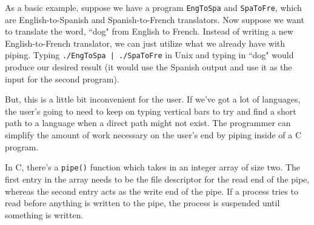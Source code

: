 As a basic example, suppose we have a program \verb!EngToSpa! and \verb!SpaToFre!, which are English-to-Spanish and Spanish-to-French translators. Now suppose we want to translate the word, ``dog" from English to French. Instead of writing a new English-to-French translator, we can just utilize what we already have with piping. Typing \verb!./EngToSpa | ./SpaToFre! in Unix and typing in ``dog" would produce our desired result (it would use the Spanish output and use it as the input for the second program).


But, this is a little bit inconvenient for the user. If we've got a lot of languages, the user's going to need to keep on typing vertical bars to try and find a short path to a language when a direct path might not exist. The programmer can simplify the amount of work necessary on the user's end by piping inside of a C program.


In C, there's a \verb!pipe()! function which takes in an integer array of size two. The first entry in the array needs to be the file descriptor for the read end of the pipe, whereas the second entry acts as the write end of the pipe. If a process tries to read before anything is written to the pipe, the process is suspended until something is written.

